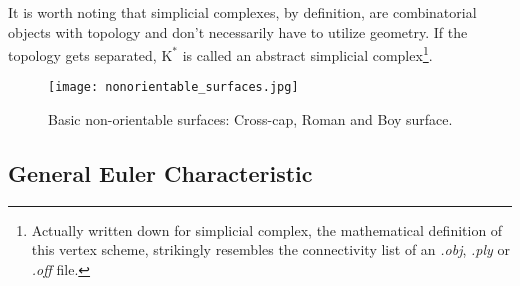It is worth noting that simplicial complexes, by definition, are combinatorial objects with topology and don't necessarily have to utilize geometry.
If the topology gets separated, $\mathrm{K}^{*}$ is called an abstract simplicial complex\footnote{ Actually written down for simplicial complex, the mathematical definition of this vertex scheme, strikingly resembles the connectivity list of an \textit{.obj}, \textit{.ply} or \textit{.off} file.}.
\begin{figure}[ht]
\centering
\texttt{[image: nonorientable\_surfaces.jpg]}
\caption[Non-orientable surfaces]{Basic non-orientable surfaces: Cross-cap, Roman and Boy surface.}
\label{fig:nonorientable_surfaces}
\end{figure}

\subsection{General Euler Characteristic}
\label{math_euler}

